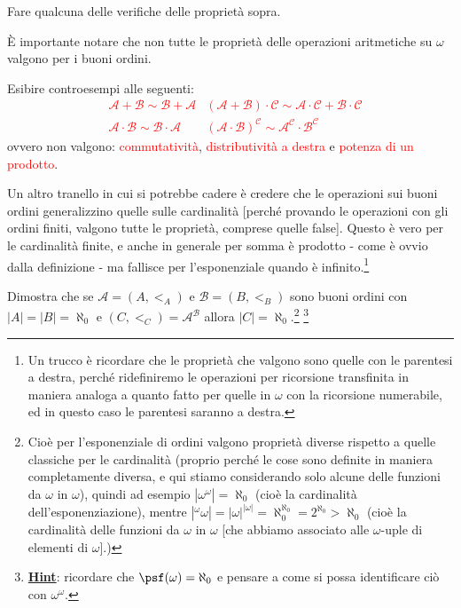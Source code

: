 \documentclass[11pt]{scrartcl}
\begin{document}
\begin{exercise}
	Fare qualcuna delle verifiche delle proprietà sopra.
\end{exercise}

È importante notare che non tutte le proprietà delle operazioni aritmetiche su $\omega$ valgono per i buoni ordini.

\begin{exercise}
	Esibire controesempi alle seguenti:
	\textcolor{red}{\begin{align*}
		& \mathcal A + \mathcal B \sim \mathcal B + \mathcal A &(\mathcal A + \mathcal B) \cdot \mathcal C \sim \mathcal A \cdot \mathcal C + \mathcal B \cdot \mathcal C \\
		& \mathcal A \cdot \mathcal B \sim \mathcal B \cdot \mathcal A &(\mathcal A \cdot \mathcal B)^{\mathcal C} \sim \mathcal A^{\mathcal C} \cdot \mathcal B^{\mathcal C}
	\end{align*}}
	ovvero non valgono: \textcolor{red}{commutatività}, \textcolor{red}{distributività a destra} e \textcolor{red}{potenza di un prodotto}.
\end{exercise}

Un altro tranello in cui si potrebbe cadere è credere che le operazioni sui buoni ordini generalizzino quelle sulle cardinalità [perché provando le operazioni con gli ordini finiti, valgono tutte le proprietà, comprese quelle false]. Questo è vero per le cardinalità finite, e anche in generale 
per somma è prodotto - come è ovvio dalla definizione - ma fallisce per l'esponenziale quando è infinito.\footnote{Un trucco è ricordare che le proprietà che valgono sono quelle con le parentesi a destra, perché ridefiniremo le operazioni per ricorsione transfinita in maniera analoga a quanto fatto per quelle in $\omega$ con la ricorsione numerabile,
ed in questo caso le parentesi saranno a destra.}

\begin{exercise}
	Dimostra che se $\mathcal A = (A,<_A)$ e $\mathcal B = (B,<_B)$ sono buoni ordini con $|A| = |B| = \aleph_0$ e $(C,<_C) = \mathcal A^{\mathcal B}$ allora $|C| = \aleph_0$.\footnote{Cioè per l'esponenziale di ordini valgono proprietà diverse rispetto a quelle classiche per le cardinalità (proprio perché le cose sono definite in maniera completamente diversa, e qui stiamo considerando solo alcune delle funzioni da $\omega$ in $\omega$),
	quindi ad esempio $|\omega^\omega| = \aleph_0$ (cioè la cardinalità dell'esponenziazione), mentre $|{}^\omega \omega| = |\omega|^{|\omega|} = \aleph_0^{\aleph_0} = 2^{\aleph_0}>\aleph_0$ (cioè la cardinalità delle funzioni da $\omega$ in $\omega$ [che abbiamo associato alle $\omega$-uple di elementi di $\omega$].)} \footnote{\underline{\textbf{Hint}}: ricordare che $\psf(\omega) = \aleph_0$ e pensare a come si possa identificare ciò con $\omega^\omega$.}
\end{exercise}
\end{document}

